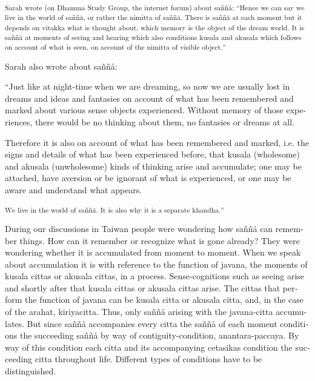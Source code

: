 \textsuperscript{\textdutch{{{Sarah wrote
(}}}\textenglish[variant=american]{{{on Dhamma Study Group, the internet
forum}}}\textdutch{{{) about saññå:
``}}}\textenglish[variant=american]{{{Hence we can say we live in the
world of sa}}}{{ññ}}{{ā}}\textenglish[variant=american]{{{, or rather
the nimitta of sa}}}{{ññ}}{{ā}}\textenglish[variant=american]{{{. There
is sa}}}{{ññ}}{{ā}}{{ }}\textenglish[variant=american]{{{at each moment
but it depends on vitakka what is thought about, which memory is the
object of the dream world. It is sa}}}{{ññ}}{{ā}}{{
}}\textenglish[variant=american]{{{at moments of seeing and hearing
which also conditions kusala and akusala which follows on account of
what is seen, on account of the nimitta of visible
object.}}}\textdutch{{{''}}}}

\textdutch{Sarah also wrote about saññå: }

``\textenglish[variant=american]{Just like at night-time when we are
dreaming, so now we are usually
lo}\textdutch{st}\textenglish[variant=american]{ in dreams and ideas and
fantasies on account of what has been remembered and marked about
various sense objects experienced. Without memory of those experiences,
there would be no thinking about them, no fantasies or dreams at all.}

\textenglish[variant=american]{Therefore it is also on account of what
has been remembered and marked, i.e. the signs and details of what has
been experienced before, that kusala (wholesome) and akusala
(unwholesome) kinds of thinking arise and accumulate}\textdutch{;}
\textdutch{one may be}\textenglish[variant=american]{ attached,
hav}\textdutch{e}\textfrench{ aversion o}\textdutch{r}
\textdutch{be}\textenglish[variant=american]{ ignorant of what is
experienced, or }\textdutch{one may be}\textenglish[variant=american]{
aware and understand what appears. }

\textsuperscript{\textdutch{W}\textenglish[variant=american]{e live in
the world of sa}ññ{{ā}}\textenglish[variant=american]{. It is also why
i}\textdutch{t}\textenglish[variant=american]{ is a separate
khandha.}\textdutch{''}}

\textdutch{During our discussions in Taiwan people were wondering how
saññå can remember things. How can it remember or recognize what is gone
already? They were wondering whether it is accumulated from moment to
moment. When we speak about accumulation it is with reference to the
function of javana, the moments of kusala cittas or akusala cittas, in a
process. Sense-cognitions such as seeing arise and shortly after that
kusala cittas or akusala cittas arise. The cittas that perform the
function of javana can be kusala citta or akusala citta, and, in the
case of the arahat, kiriyacitta. Thus, only saññå arising with the
javana-citta accumulates. But since saññå accompanies every citta the
saññå of each moment conditions the succeeding saññå by way of
contiguity-condition, anantara-paccaya. By way of this condition each
citta and its accompanying cetasikas condition the succeeding citta
throughout life. Different types of conditions have to be
distinguished.}

